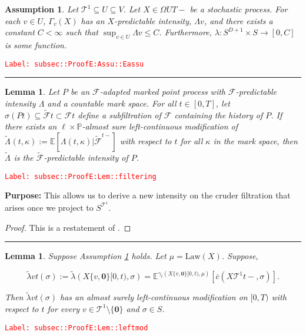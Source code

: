 \documentclass[12pt]{article}
\newcommand{\mb}{\mathbb}
\newcommand{\mc}{\mathcal}
\newcommand{\ra}{\rightarrow}
\newcommand{\ov}{\overline}
\newcommand{\te}{\text}
\newcommand{\tr}{\textcolor{red}}
\newcommand{\labe}[1]{\tr{\texttt{Label: #1}}}
\newcommand{\purpose}{\textbf{Purpose: }}
\newcommand{\lin}{\rule{\linewidth}{0.4 pt}}
\newcommand{\pr}{\mb{P}}							%
\newcommand{\ex}[1]{\mb{E}\left[#1\right]}			%
\newcommand{\exmu}[2]{\mb{E}^{#1}\left[#2\right]}	%
\renewcommand{\root}{\mathbf{0}}				%
\renewcommand{\v}{v}							%
\renewcommand{\U}{U}							%
\renewcommand{\S}{S}							%
\newcommand{\s}{\sigma}							%
\newcommand{\T}{T}								%
\renewcommand{\t}{t}							%
\newcommand{\F}{\mc{F}}							%
\newcommand{\X}{X}								%
\newcommand{\const}{C}							%
\newcommand{\degr}{D}							%
\newcommand{\IGrg}{\ov{c}}						%
\newcommand{\tree}{\mc{T}}						%
\newcommand{\sln}[1]{^{#1}}						%
\newcommand{\Sm}{\ell}							%
\newcommand{\alt}[1]{\widetilde{#1}}			%
\newcommand{\m}{\mu}							%
\newcommand{\cm}{\gamma}						%
\newcommand{\law}{\te{Law}}						%
\newcommand{\pmap}[1]{\Gamma_{#1}}				%
\renewcommand{\mark}{\kappa}					%
\newcommand{\rp}{P}								%
\newcommand{\ratee}{\Lambda}					%
\newcommand{\crate}{\alt{\lambda}}				%
\newcommand{\cratee}[2]{\alt{\Lambda}_{#1}^{#2}} 	%
\newtheorem{lem}[thms]{Lemma}
\newtheorem{assu}[thms]{Assumption}
\begin{document}
\begin{assu}
Let \(\tree\sln{1}\subseteq\U \subseteq  V\). Let \(\X{}{}\in \Omega{\U}{\T-}\) be a stochastic process. For each \(\v\in \U\), \(\pmap{\v}(\X{}{})\) has an \(\X{}{}\)-predictable intensity, \(\ratee{\v}\), and there exists a constant \(\const{} < \infty\) such that \(\sup_{\v\in\U} \ratee{\v} \leq \const{}\). Furthermore, \(\lambda: \S^{\degr+1}\times \S\ra[0,\const{}]\) is some function.
\label{subsec::ProofE:Assu::Eassu}
\end{assu}
\labe{subsec::ProofE:Assu::Eassu}

\lin

\begin{lem}
Let \(\rp{}\) be an \(\F{}{}\)-adapted marked point process with \(\F{}{}\)-predictable intensity \(\ratee{}\) and a countable mark space. For all \(\t \in [0,\T]\), let \(\sigma(\rp{\t}) \subseteq \alt{\F{}}{\t}\subset \F{}{\t}\) define a subfiltration of \(\F{}{}\) containing the history of \(\rp{}\). If there exists an \(\Sm\times \pr\)-almost sure left-continuous modification of \(\cratee{}{}(\t,\mark{}) := \ex{\ratee{}(\t,\mark{})|\alt{\F{}{}}^{\t-}}\) with respect to \(\t\) for all \(\mark{}\) in the mark space, then \(\cratee{}{}\) is the \(\alt{\F{}{}}\)-predictable intensity of \(\rp{}\).
\label{subsec::ProofE:Lem::filtering}
\end{lem}
\labe{subsec::ProofE:Lem::filtering}

\purpose This allows us to derive a new intensity on the cruder filtration that arises once we project to \(\S^{\tree^1}\).

\begin{proof}
This is a restatement of \cite[Theorem 14.3.III]{DalVer08}.
\end{proof}

\lin

\begin{lem}
Suppose Assumption \ref{subsec::ProofE:Assu::Eassu} holds. Let \(\m{}{}{} = \law(\X{}{})\). Suppose,

\[\crate{\v}{\t}(\s) := \crate{}{}(\X{\{\v,\root\}}{[0,\t)},\s) = \exmu{\cm_\t(\X{\{\v,\root\}}{[0,\t)},\m{}{}{})}{\IGrg(\X{\tree\sln{1}}{\t-},\s)}.\]


Then \(\crate{\v}{\t}(\s)\) has an almost surely left-continuous modification on \([0,\T)\) with respect to \(\t\) for every \(\v \in \tree\sln{1}\setminus\{\root\}\) and \(\s \in \S\).
\label{subsec::ProofE:Lem::leftmod}
\end{lem}
\labe{subsec::ProofE:Lem::leftmod}
\end{document}
